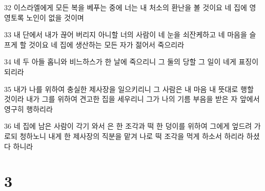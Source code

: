 \par 32 이스라엘에게 모든 복을 베푸는 중에 너는 내 처소의 환난을 볼 것이요 네 집에 영영토록 노인이 없을 것이며
\par 33 내 단에서 내가 끊어 버리지 아니할 너의 사람이 네 눈을 쇠잔케하고 네 마음을 슬프게 할 것이요 네 집에 생산하는 모든 자가 젊어서 죽으리라
\par 34 네 두 아들 홉니와 비느하스가 한 날에 죽으리니 그 둘의 당할 그 일이 네게 표징이 되리라
\par 35 내가 나를 위하여 충실한 제사장을 일으키리니 그 사람은 내 마음 내 뜻대로 행할 것이라 내가 그를 위하여 견고한 집을 세우리니 그가 나의 기름 부음을 받은 자 앞에서 영구히 행하리라
\par 36 네 집에 남은 사람이 각기 와서 은 한 조각과 떡 한 덩이를 위하여 그에게 엎드려 가로되 청하노니 내게 한 제사장의 직분을 맡겨 나로 떡 조각을 먹게 하소서 하리라 하셨다 하니라

\chapter{3}

